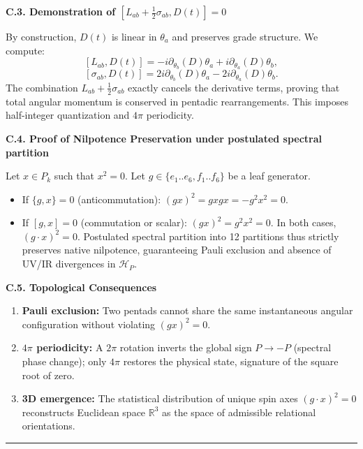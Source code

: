 \documentclass[11pt]{article}
\providecommand{\tightlist}{\setlength{\itemsep}{2pt}\setlength{\parskip}{6pt}}
\let\oldmathcal\mathcal
\renewcommand{\mathcal}[1]{\oldmathcal{#1}}
\providecommand{\tightlist}{%
  \setlength{\itemsep}{2pt}\setlength{\parskip}{6pt}
}
\begin{document}
\textbf{C.3. Demonstration of
\([L_{ab} + \frac{1}{2}\sigma_{ab}, D(t)] = 0\)}

By construction, \(D(t)\) is linear in \(\theta_a\) and preserves grade
structure. We compute: \[
[L_{ab}, D(t)] = -i \partial_{\theta_b}(D) \theta_a + i \partial_{\theta_a}(D) \theta_b,
\] \[
[\sigma_{ab}, D(t)] = 2i \partial_{\theta_b}(D) \theta_a - 2i \partial_{\theta_a}(D) \theta_b.
\] The combination \(L_{ab} + \frac{1}{2}\sigma_{ab}\) exactly cancels
the derivative terms, proving that total angular momentum is conserved
in pentadic rearrangements. This imposes half-integer quantization and
\(4\pi\) periodicity.

\textbf{C.4. Proof of Nilpotence Preservation under postulated spectral
partition}

Let \(x \in P_k\) such that \(x^2=0\). Let
\(g \in \{e_1..e_6, f_1..f_6\}\) be a leaf generator.

\begin{itemize}
\tightlist
\item
  If \(\{g,x\}=0\) (anticommutation): \((gx)^2 = gxgx = -g^2 x^2 = 0\).
\item
  If \([g,x]=0\) (commutation or scalar): \((gx)^2 = g^2 x^2 = 0\). In
  both cases, \((g\cdot x)^2=0\). Postulated spectral partition into 12
  partitions thus strictly preserves native nilpotence, guaranteeing
  Pauli exclusion and absence of UV/IR divergences in \(\mathcal{H}_P\).
\end{itemize}

\textbf{C.5. Topological Consequences}

\begin{enumerate}
\def\labelenumi{\arabic{enumi}.}
\tightlist
\item
  \textbf{Pauli exclusion:} Two pentads cannot share the same
  instantaneous angular configuration without violating \((gx)^2=0\).
\item
  \textbf{\(4\pi\) periodicity:} A \(2\pi\) rotation inverts the global
  sign \(P \to -P\) (spectral phase change); only \(4\pi\) restores the
  physical state, signature of the square root of zero.
\item
  \textbf{3D emergence:} The statistical distribution of unique spin
  axes \((g\cdot x)^2=0\) reconstructs Euclidean space \(\mathbb{R}^3\)
  as the space of admissible relational orientations.
\end{enumerate}

\begin{center}\rule{0.5\linewidth}{0.5pt}\end{center}
\end{document}
